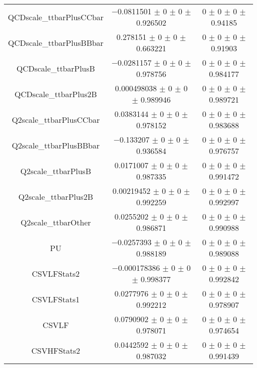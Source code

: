 \begin{table}
\begin{tabular}{ccc}
QCDscale\_ttbarPlusCCbar 	& \num{-0.0811501} $\pm$ \num{0} $\pm$ \num{0} $\pm$ \num{0.926502} 	& \num{0} $\pm$ \num{0} $\pm$ \num{0} $\pm$ \num{0.94185}\\
QCDscale\_ttbarPlusBBbar 	& \num{0.278151} $\pm$ \num{0} $\pm$ \num{0} $\pm$ \num{0.663221} 	& \num{0} $\pm$ \num{0} $\pm$ \num{0} $\pm$ \num{0.91903}\\
QCDscale\_ttbarPlusB 	& \num{-0.0281157} $\pm$ \num{0} $\pm$ \num{0} $\pm$ \num{0.978756} 	& \num{0} $\pm$ \num{0} $\pm$ \num{0} $\pm$ \num{0.984177}\\
QCDscale\_ttbarPlus2B 	& \num{0.000498038} $\pm$ \num{0} $\pm$ \num{0} $\pm$ \num{0.989946} 	& \num{0} $\pm$ \num{0} $\pm$ \num{0} $\pm$ \num{0.989721}\\
Q2scale\_ttbarPlusCCbar 	& \num{0.0383144} $\pm$ \num{0} $\pm$ \num{0} $\pm$ \num{0.978152} 	& \num{0} $\pm$ \num{0} $\pm$ \num{0} $\pm$ \num{0.983688}\\
Q2scale\_ttbarPlusBBbar 	& \num{-0.133207} $\pm$ \num{0} $\pm$ \num{0} $\pm$ \num{0.936584} 	& \num{0} $\pm$ \num{0} $\pm$ \num{0} $\pm$ \num{0.976757}\\
Q2scale\_ttbarPlusB 	& \num{0.0171007} $\pm$ \num{0} $\pm$ \num{0} $\pm$ \num{0.987335} 	& \num{0} $\pm$ \num{0} $\pm$ \num{0} $\pm$ \num{0.991472}\\
Q2scale\_ttbarPlus2B 	& \num{0.00219452} $\pm$ \num{0} $\pm$ \num{0} $\pm$ \num{0.992259} 	& \num{0} $\pm$ \num{0} $\pm$ \num{0} $\pm$ \num{0.992997}\\
Q2scale\_ttbarOther 	& \num{0.0255202} $\pm$ \num{0} $\pm$ \num{0} $\pm$ \num{0.986871} 	& \num{0} $\pm$ \num{0} $\pm$ \num{0} $\pm$ \num{0.990988}\\
PU 	& \num{-0.0257393} $\pm$ \num{0} $\pm$ \num{0} $\pm$ \num{0.988189} 	& \num{0} $\pm$ \num{0} $\pm$ \num{0} $\pm$ \num{0.989088}\\
CSVLFStats2 	& \num{-0.000178386} $\pm$ \num{0} $\pm$ \num{0} $\pm$ \num{0.998377} 	& \num{0} $\pm$ \num{0} $\pm$ \num{0} $\pm$ \num{0.992842}\\
CSVLFStats1 	& \num{0.0277976} $\pm$ \num{0} $\pm$ \num{0} $\pm$ \num{0.992212} 	& \num{0} $\pm$ \num{0} $\pm$ \num{0} $\pm$ \num{0.978907}\\
CSVLF 	& \num{0.0790902} $\pm$ \num{0} $\pm$ \num{0} $\pm$ \num{0.978071} 	& \num{0} $\pm$ \num{0} $\pm$ \num{0} $\pm$ \num{0.974654}\\
CSVHFStats2 	& \num{0.0442592} $\pm$ \num{0} $\pm$ \num{0} $\pm$ \num{0.987032} 	& \num{0} $\pm$ \num{0} $\pm$ \num{0} $\pm$ \num{0.991439}\\

\end{tabular}
\end{table}
